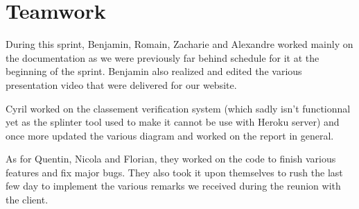 \section{Teamwork}

During this sprint, Benjamin, Romain, Zacharie and Alexandre worked mainly on the documentation as we were previously far behind schedule for it at the beginning of the sprint. Benjamin also realized and edited the various presentation video that were delivered for our website. \newline

Cyril worked on the classement verification system (which sadly isn't functionnal yet as the splinter tool used to make it cannot be use with Heroku server) and once more updated the various diagram and worked on the report in general. \newline

As for Quentin, Nicola and Florian, they worked on the code to finish various features and fix major bugs. They also took it upon themselves to rush the last few day to implement the various remarks we received during the reunion with the client.

